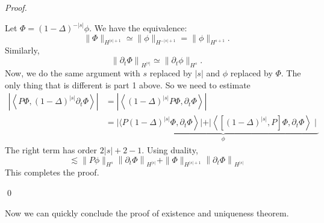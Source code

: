 \begin{proof}
\begin{itemize}
        Let $\Phi = (1-\Delta)^{-|s|}\phi$. We have the equivalence: 
        \[
            \|\Phi\|_{H^{|s|+1}} \simeq\|\phi\|_{H^{-|s|+1}}=\|\phi\|_{H^{s+1}}. 
        \]
        Similarly, 
        \[
            \left\|\partial_{t} \Phi\right\|_{H^{|s|}} \simeq \| \partial_{t} \phi \|_{H^{s}}.
        \]
        Now, we do the same argument with $s$ replaced by $|s|$ and $\phi$ replaced by $\Phi$. The only thing that is different is part 1 above. So we need to estimate
        $$
        \begin{aligned}
        \left|\left\langle P \Phi,(1-\Delta)^{|s|} \partial_{t} \Phi\right\rangle\right| &=\left|\left\langle(1-\Delta)^{|s|} P \Phi, \partial_{t} \Phi\right\rangle\right| \\
        &=\mid\langle P \underbrace{\left.(1-\Delta)^{|s|} \Phi, \partial_{t} \Phi\right\rangle|+|\left\langle\left[(1-\Delta)^{|s|}, P\right] \Phi, \partial_{t} \Phi\right\rangle \mid}_{\phi}
        \end{aligned}
        $$
        The right term has order $2|s|+2-1$. Using duality,
        $$
        \lesssim\|P \phi\|_{H^{s}}\left\|\partial_{t} \Phi\right\|_{H^{|s|}}+\|\Phi\|_{H^{|s|+1}}\left\|\partial_{t} \Phi\right\|_{H^{|s|}}
        $$
        This completes the proof.
\end{itemize}
\qed
\end{proof}

Now we can quickly conclude the proof of existence and uniqueness theorem. 

